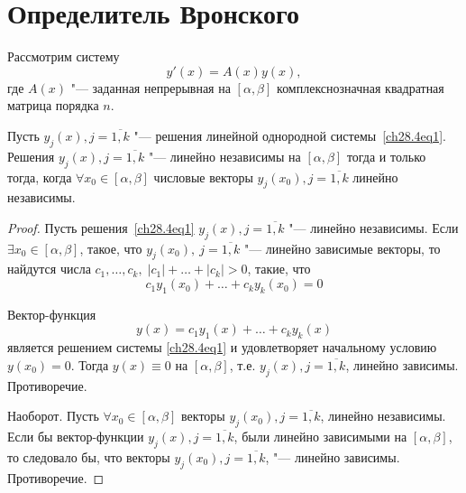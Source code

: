 \section{Определитель Вронского}

Рассмотрим систему 
\begin{equation} \label{ch28.4eq1}
y'(x) = A(x)y(x),
\end{equation}
где $A(x)$ "--- заданная непрерывная на $[\alpha, \beta]$ комплекснозначная квадратная матрица порядка $n$.

\begin{thm} \label{ch28.3thm1}
Пусть $y_j(x), j = \overline{1,k}$ "--- решения линейной однородной системы~\eqref{ch28.4eq1}. Решения $y_j(x), j = \overline{1,k}$ "--- линейно независимы на $[\alpha, \beta]$ тогда и только тогда, когда $\forall x_0 \in [\alpha, \beta]$ числовые векторы $y_j(x_0), j = \overline{1,k}$ линейно независимы.
\end{thm}

\begin{proof}
Пусть решения~\eqref{ch28.4eq1} $y_j(x), j = \overline{1,k}$ "--- линейно независимы. Если $\exists x_0 \in [\alpha, \beta]$, такое, что $y_j(x_0),\ j = \overline{1,k}$ "--- линейно зависимые векторы, то найдутся числа $c_1, \ldots, c_k, \; |c_1| + \ldots + |c_k| > 0$, такие, что
$$
c_1y_1(x_0) + \ldots + c_k y_k(x_0) = 0
$$

Вектор-функция
$$
y(x) = c_1y_1(x) + \ldots + c_k y_k(x)
$$
является решением системы \eqref{ch28.4eq1} и удовлетворяет начальному условию $y(x_0) = 0$. Тогда $y(x) \equiv 0$ на $[\alpha, \beta]$, т.е. $y_j(x), j = \overline{1,k}$, линейно зависимы. Противоречие.

Наоборот. Пусть $\forall x_0 \in [\alpha, \beta]$ векторы $y_j(x_0), j = \overline{1,k}$, линейно независимы. Если бы вектор-функции $y_j(x), j = \overline{1,k}$, были линейно зависимыми на $[\alpha,\beta]$, то следовало бы, что векторы $y_j(x_0), j = \overline{1,k}$, "--- линейно зависимы. Противоречие.
\end{proof}

